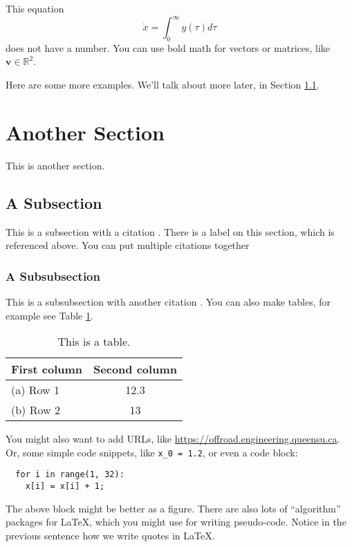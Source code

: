 \documentclass[12pt,letterpaper,fleqn,oneside]{qu-handout}
\newcommand*{\mintpy}[1]{\texttt{#1}}
\newcommand{\Real}{\mathbb R}
\newcommand{\mbf}{\bm}
\begin{document}
This equation
\begin{equation*}
  \dot{x} = \int_{0}^\infty y(\tau)d\tau
\end{equation*}
does not have a number.  You can use bold math for vectors or matrices, like $\mbf{v}\in\Real^2$.

Here are some more examples.  We'll talk about more later, in Section \ref{sec:special}.

\section{Another Section}

This is another section.

\subsection{A Subsection}
\label{sec:special}

This is a subsection with a citation \cite{Ogata:2001aa}.  There is a label on this section, which is referenced above.  You can put multiple citations together \cite{Marshall:2004aa,Ogata:2001aa}

\subsubsection{A Subsubsection}

This is a subsubsection with another citation \cite[p.\ 1964]{Marshall:2004aa}.  You can also make tables, for example see Table \ref{tbl:example}.

\begin{table}
  \caption{This is a table.}
  \begin{center}
    \begin{tabular}{lc}
      \toprule
      \bf First column & \bf Second column \\ \midrule
      (a) Row 1 & 12.3 \\
      (b) Row 2 & 13 \\
      \bottomrule
    \end{tabular}
  \end{center}
  \label{tbl:example}
\end{table}%

You might also want to add URLs, like \url{https://offroad.engineering.queensu.ca}.  Or, some simple code snippets, like  \mintpy{x_0 = 1.2}, or even a code block:
\begin{verbatim}
  for i in range(1, 32):
    x[i] = x[i] + 1;
\end{verbatim}
The above block might be better as a figure.  There are also lots of ``algorithm'' packages for LaTeX, which you might use for writing pseudo-code.  Notice in the previous sentence how we write quotes in \LaTeX.
\end{document}
